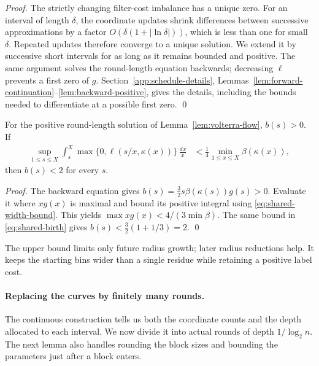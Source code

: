\documentclass[runningheads,envcountsame,envcountsect,orivec]{llncs}
\begin{document}
\begin{proof}
The strictly changing filter-cost imbalance has a unique zero.
For an interval of length $\delta$, the coordinate updates
shrink differences between successive approximations by a factor
$O(\delta(1+|\ln\delta|))$, which is less than one for small
$\delta$. Repeated updates therefore converge to a unique
solution. We extend it by successive short intervals for as long
as it remains bounded and positive. The same argument solves the
round-length equation backwards; decreasing $\ell$ prevents a
first zero of $g$.
Section~\ref{app:schedule-details},
Lemmas~\ref{lem:forward-continuation}--\ref{lem:backward-positive},
gives the details, including the bounds needed to differentiate
at a possible first zero.
\qed
\end{proof}

\begin{lemma}
\label{lem:shared-widths}
For the positive round-length solution of
Lemma~\ref{lem:volterra-flow}, $b(s)>0$.
If
\begin{align}
 \sup_{1\le s\le X}\int_s^X\max\{0,\ell(s/x,\kappa(x))\}\,\frac{dx}{x}
 &<\frac14\min_{1\le x\le X}\beta(\kappa(x)),
 \label{eq:shared-width-bound}
\end{align}
then $b(s)<2$ for every $s$.
\end{lemma}

\begin{proof}
The backward equation gives
$b(s)=\tfrac32s\beta(\kappa(s))g(s)>0$.
Evaluate it where $xg(x)$ is maximal and bound its positive
integral using \eqref{eq:shared-width-bound}. This yields
$\max xg(x)<4/(3\min\beta)$. The same bound in
\eqref{eq:shared-birth} gives
$b(s)<\tfrac32(1+1/3)=2$.
\qed
\end{proof}

The upper bound limits only future radius growth; later
radius reductions help. It keeps the starting bins wider than a
single residue while retaining a positive label cost.

\paragraph{Replacing the curves by finitely many rounds.}
The continuous construction tells us both the coordinate
counts and the depth allocated to each interval. We now
divide it into actual rounds of depth $1/\log_2 n$.
The next lemma also handles rounding the block sizes
and bounding the parameters just after a block enters.
\end{document}
